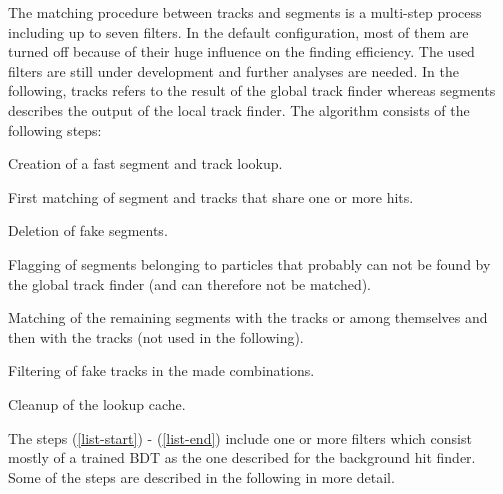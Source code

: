 The matching procedure between tracks and segments is a multi-step process including up to seven filters. In the default configuration, most of them are turned off because of their huge influence on the finding efficiency. The used filters are still under development and further analyses are needed. In the following, tracks refers to the result of the global track finder whereas segments describes the output of the local track finder. The algorithm consists of the following steps:
\begin{zlist}
 \item Creation of a fast segment and track lookup.
 \item First matching of segment and tracks that share one or more hits. \label{list-start}
 \item Deletion of fake segments. \label{list-fakes}
 \item Flagging of segments belonging to particles that probably can not be found by the global track finder (and can therefore not be matched).
 \item Matching of the remaining segments with the tracks or among themselves and then with the tracks (not used in the following). \label{list-second}
 \item Filtering of fake tracks in the made combinations.  \label{list-end}
 \item Cleanup of the lookup cache.
\end{zlist}

The steps (\ref{list-start}) - (\ref{list-end}) include one or more filters which consist mostly of a trained BDT as the one described for the background hit finder. Some of the steps are described in the following in more detail.

